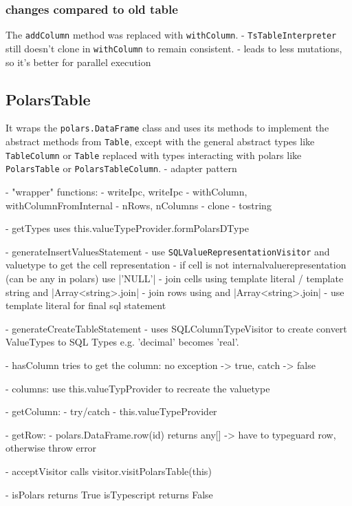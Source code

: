 \subsubsection{changes compared to old table}
\label{subssubsection:impl:old_vs_new}
The \Verb|addColumn| method was replaced with \Verb|withColumn|.
- \Verb|TsTableInterpreter| still doesn't clone in \Verb|withColumn| to remain consistent.
- leads to less mutations, so it's better for parallel execution %




\subsection{PolarsTable}
It wraps the \Verb|polars.DataFrame| class and uses its methods to implement the abstract methods from \Verb|Table|, except with the general abstract types like \Verb|TableColumn| or \Verb|Table| replaced with types interacting with polars like \Verb|PolarsTable| or \Verb|PolarsTableColumn|.
- adapter pattern

- "wrapper" functions:
- writeIpc, writeIpc
- withColumn, withColumnFromInternal
- nRows, nColumns
- clone
- tostring

- getTypes uses this.valueTypeProvider.formPolarsDType

- generateInsertValuesStatement
- use \Verb|SQLValueRepresentationVisitor| and valuetype to get the cell representation
- if cell is not internalvaluerepresentation (can be any in polars) use |'NULL'|
- join cells using template literal / template string and |Array<string>.join|
- join rows using and |Array<string>.join|
- use template literal for final sql statement

- generateCreateTableStatement
- uses SQLColumnTypeVisitor to create convert ValueTypes to SQL Types e.g. 'decimal' becomes 'real'.

- hasColumn tries to get the column: no exception -> true, catch -> false

- columns: use this.valueTypProvider to recreate the valuetype

- getColumn:
- try/catch
- this.valueTypeProvider

- getRow:
- polars.DataFrame.row(id) returns any[] -> have to typeguard row, otherwise throw error

- acceptVisitor calls visitor.visitPolarsTable(this)

- isPolars returns True isTypescript returns False


